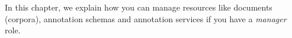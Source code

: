 In this chapter, we explain how you can manage resources like documents
(corpora), annotation schemas and annotation services if you have a \emph{manager} role.




